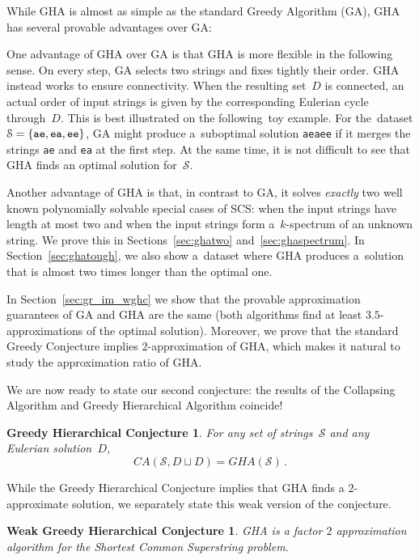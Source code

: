 While GHA is almost as simple as the standard Greedy Algorithm (GA), GHA has several provable advantages over GA:
\begin{description}
\item One advantage of GHA over GA is that GHA is more flexible in the following sense. On every step, GA selects two strings and fixes tightly their order. GHA instead works to ensure connectivity. When the resulting set~$D$ is connected, an actual order of input strings is given by the corresponding Eulerian cycle through~$D$. This is best illustrated on the following~toy example. For the~dataset $\mathcal{S}=\{{\tt ae}, {\tt ea}, {\tt ee}\}$, GA might produce a~suboptimal solution {\tt aeaee} if it merges the strings {\tt ae} and {\tt ea} at the first step. At the same time, it is not difficult to see that GHA finds an optimal solution for~$\mathcal{S}$.
\item Another advantage of GHA is that, in contrast to GA, it solves {\em exactly} two well known polynomially solvable special cases of SCS: when the input strings have length at most two and when the input strings form a~$k$-spectrum of an unknown string. We prove this in Sections~\ref{sec:ghatwo} and~\ref{sec:ghaspectrum}. In Section~\ref{sec:ghatough}, we also show a~dataset where GHA produces a~solution that is almost two times longer than the optimal one.
\item In Section~\ref{sec:gr_im_wghc} we show that the provable approximation guarantees of GA and GHA are the same (both algorithms find at least $3.5$-approximations of the optimal solution). Moreover, we prove that the standard Greedy Conjecture implies $2$-approximation of GHA, which makes it natural to study the approximation ratio of GHA.
\end{description}
  

We are now ready to state our second conjecture: the results of the Collapsing Algorithm and Greedy Hierarchical Algorithm coincide!
\newtheorem*{ghcc}{Greedy Hierarchical Conjecture}
\begin{ghcc}
For any set of strings~$\mathcal{S}$ and any Eulerian solution~$D$,
\[CA(\mathcal{S}, D \sqcup D) = GHA(\mathcal{S}) \, .\]
\end{ghcc}
While the Greedy Hierarchical Conjecture implies that GHA finds a $2$-approximate solution, we separately state this weak version of the conjecture.

\newtheorem*{wghcc}{Weak Greedy Hierarchical Conjecture}
\begin{wghcc}
GHA is a factor $2$ approximation algorithm for the Shortest Common Superstring problem.
\end{wghcc}